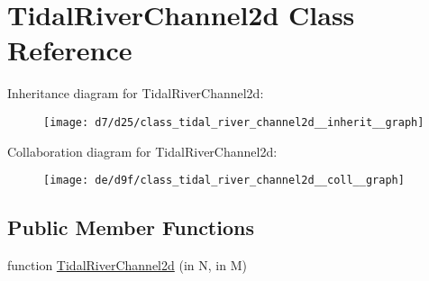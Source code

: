 \hypertarget{class_tidal_river_channel2d}{}\section{Tidal\+River\+Channel2d Class Reference}
\label{class_tidal_river_channel2d}


Inheritance diagram for Tidal\+River\+Channel2d\+:
\nopagebreak
\begin{figure}[H]
\begin{center}
\leavevmode
\texttt{[image: d7/d25/class\_tidal\_river\_channel2d\_\_inherit\_\_graph]}
\end{center}
\end{figure}


Collaboration diagram for Tidal\+River\+Channel2d\+:
\nopagebreak
\begin{figure}[H]
\begin{center}
\leavevmode
\texttt{[image: de/d9f/class\_tidal\_river\_channel2d\_\_coll\_\_graph]}
\end{center}
\end{figure}
\subsection*{Public Member Functions}
\begin{DoxyCompactItemize}
\item 
function \hyperlink{class_tidal_river_channel2d_af7b85dc0193d941c19bfb65ce178cc73}{Tidal\+River\+Channel2d} (in N, in M)
\end{DoxyCompactItemize}
